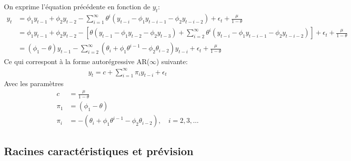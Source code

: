 \documentclass{article}
\begin{document}
\begin{enumerate}
  On exprime l'équation précédente en fonction de $y_t$:
  \begin{align*}
    y_t &= \phi_1 y_{t-1} + \phi_2 y_{t-2} - \sum_{i=1}^{\infty} \theta^i \left(y_{t-i} - \phi_1 y_{t-i-1} - \phi_2 y_{t-i-2} \right) + \epsilon_t + \frac{\mu}{1-\theta} \\
    &= \phi_1 y_{t-1} + \phi_2 y_{t-2} - \left[\theta\left(y_{t-1}-\phi_1 y_{t-2} - \phi_2 y_{t-3} \right) + \sum_{i=2}^{\infty} \theta^i \left(y_{t-i} - \phi_1 y_{t-i-1} - \phi_2 y_{t-i-2} \right)\right] + \epsilon_t + \frac{\mu}{1-\theta}  \\
    &= (\phi_1 - \theta) y_{t-1} - \sum_{i=2}^{\infty} \left(\theta_i+\phi_1\theta^{i-1} - \phi_2\theta_{i-2}\right) y_{t-i} + \epsilon_t + \frac{\mu}{1-\theta}
  \end{align*}
  Ce qui correspont à la forme autorégressive AR($\infty$) suivante:
  \begin{align*}
    y_t = c + \sum_{i=1}^{\infty} \pi_i y_{t-i} + \epsilon_t
  \end{align*}
  Avec les paramètres
  \begin{align*}
    c &= \frac{\mu}{1-\theta} \\
    \pi_1 &= (\phi_1 - \theta) \\
    \pi_i &= -\left(\theta_i+\phi_1\theta^{i-1} - \phi_2\theta_{i-2}\right),\quad i=2,3,\ldots
  \end{align*}
  
\end{enumerate}

\subsection{Racines caractéristiques et prévision}
\end{document}
